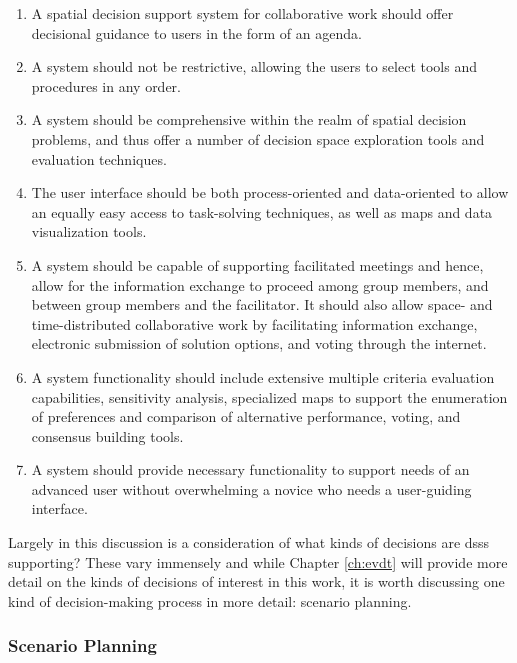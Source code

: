 \begin{enumerate}
    \setlength{\itemsep}{0pt}%
    \setlength{\parskip}{0pt}%
	\item{A spatial decision support system for collaborative work should offer decisional guidance to users in the form of an agenda.}
	\item{A system should not be restrictive, allowing the users to select tools and procedures in any order.}
	\item{A system should be comprehensive within the realm of spatial decision problems, and thus offer a number of decision space exploration tools and evaluation techniques.}
	\item{The user interface should be both process-oriented and data-oriented to allow an equally easy access to task-solving techniques, as well as maps and data visualization tools.}
	\item{A system should be capable of supporting facilitated meetings and hence, allow for the information exchange to proceed among group members, and between group members and the facilitator. It should also allow space- and time-distributed collaborative work by facilitating information exchange, electronic submission of solution options, and voting through the internet.}
	\item{A system functionality should include extensive multiple criteria evaluation capabilities, sensitivity analysis, specialized maps to support the enumeration of preferences and comparison of alternative performance, voting, and consensus building tools.}
	\item{A system should provide necessary functionality to support needs of an advanced user without overwhelming a novice who needs a user-guiding interface.}
\end{enumerate}

Largely in this discussion is a consideration of what kinds of decisions are \acp{dss} supporting? These vary immensely and while Chapter \ref{ch:evdt} will provide more detail on the kinds of decisions of interest in this work, it is worth discussing one kind of decision-making process in more detail: scenario planning.

\subsubsection{Scenario Planning}

